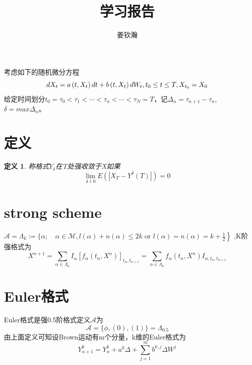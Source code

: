 \documentclass{article}%
\title{学习报告}
\author{姜钦瀚}
\newtheorem{definition}{\bf 定义}[section]
\begin{document}
	\maketitle
考虑如下的随机微分方程
\begin{equation}
d X_{t}=a\left(t, X_{t}\right) d t+b\left(t, X_{t}\right) d W_{t},t_0\leq t \leq T,\\
X_{t_0}=X_0
\end{equation}
给定时间划分$t_{0}=\tau_{0}<\tau_{1}<\cdots<\tau_{n}<\cdots<\tau_{N}=T$，记$\Delta_n=\tau_{n+1}-\tau_{n}$,$\delta=max\Delta_n$。
\section{定义}
\begin{definition}
称格式$Y_\delta$在T处强收敛于X如果	
\begin{equation}
\lim _{\delta \downarrow 0} E\left(\left|X_{T}-Y^{\delta}(T)\right|\right)=0
\end{equation}
\end{definition}
\section{strong scheme}
$\mathcal{A}=\Lambda_{k}:=\{\alpha ; \quad \alpha \in \mathcal{M}, l(\alpha)+n(\alpha) \leq 2 k$
or $\left.l(\alpha)=n(\alpha)=k+\frac{1}{2}\right\}$ 
,K阶强格式为
\begin{equation}X^{n+1}=\sum_{\alpha \in \Lambda_{k}} I_{\alpha}\left[f_{\alpha}\left(t_{n}, X^{n}\right)\right]_{t_{n}, t_{n+1}}=\sum_{\alpha \in \Lambda_{k}} f_{\alpha}\left(t_{n}, X^{n}\right) I_{\alpha, t_{n}, t_{n+1}}\end{equation}
\section{Euler格式}
Euler格式是强0.5阶格式定义$\mathcal{A}$为\begin{equation}\mathcal{A}=\{\phi,(0),(1)\}=\Lambda_{0.5}\end{equation}
由上面定义可知设Brown运动有m个分量，k维的Euler格式为
\begin{equation}
Y_{n+1}^{k}=Y_{n}^{k}+a^{k} \Delta+\sum_{j=1}^{m} b^{k, j} \Delta W^{j}
\end{equation}
\end{document}
